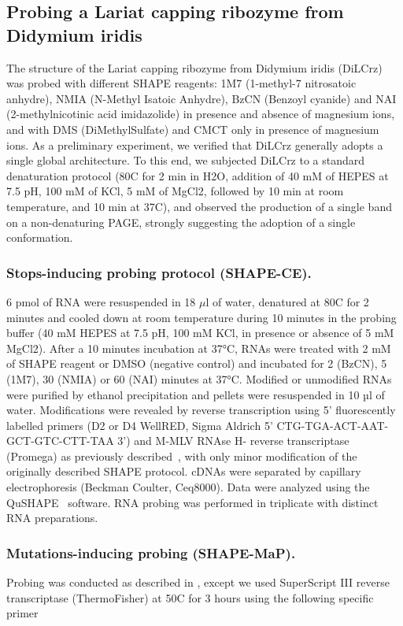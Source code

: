 \documentclass[a4,center,fleqn]{NAR}
\newcommand{\Draft}[1]{{#1}}
\newcommand{\ypi}[1]{\Draft{\todo[color=blue!30,inline]{\sf Yann: #1}}}
\begin{document}
\subsection{Probing a Lariat capping ribozyme from Didymium iridis}
The structure of the Lariat capping ribozyme from Didymium iridis (DiLCrz) was probed with different SHAPE reagents: 1M7 (1-methyl-7 nitrosatoic anhydre), NMIA (N-Methyl Isatoic Anhydre), BzCN (Benzoyl cyanide) and NAI (2-methylnicotinic acid imidazolide) in presence and absence of magnesium ions, and with DMS (DiMethylSulfate) and CMCT only in presence of magnesium ions.
As a preliminary experiment, we verified that DiLCrz generally adopts a single global architecture. To this end, we subjected DiLCrz to a standard denaturation protocol (80\degree{}C for 2 min in H2O, addition of 40 mM of HEPES at 7.5 pH, 100 mM of KCl, 5 mM of MgCl2, followed by 10 min at room temperature, and 10 min at 37\degree{}C), and observed the production of a single band on a non-denaturing PAGE, strongly suggesting the adoption of a single conformation.\ypi{Bruno $\to$ Est ce que c'est raisonnable ? OUI}

\subsubsection{Stops-inducing probing protocol (SHAPE-CE).} 
6 pmol of RNA were resuspended in 18 $\mu$l of water, denatured at 80\degree{}C for 2 minutes and cooled down at room temperature during 10 minutes in the probing buffer (40 mM HEPES at 7.5 pH, 100 mM KCl, in presence or absence of 5 mM MgCl2). After a 10 minutes incubation at 37°C, RNAs were treated with 2 mM of SHAPE reagent or DMSO (negative control) and incubated for 2 (BzCN), 5 (1M7), 30 (NMIA) or 60 (NAI) minutes at 37°C. Modified or unmodified RNAs were purified by ethanol precipitation and pellets were resuspended in 10 \(µ\)l of water.
Modifications were revealed by reverse transcription using 5’ fluorescently labelled primers (D2 or D4 WellRED, Sigma Aldrich 5’ CTG-TGA-ACT-AAT-GCT-GTC-CTT-TAA 3’) and M-MLV RNAse H- reverse transcriptase (Promega) as previously described~\cite{Deforges2017}, with only minor modification of the originally described SHAPE protocol\cite{Wilkinson2006}. cDNAs were separated by capillary electrophoresis (Beckman Coulter, Ceq8000). Data were analyzed using the  QuSHAPE~\cite{Karabiber2013} software. RNA probing was performed in triplicate with distinct RNA preparations.

\subsubsection{Mutations-inducing probing (SHAPE-MaP).}
Probing was conducted as described in \citet{Smola2015}, except we used SuperScript III reverse transcriptase (ThermoFisher) at 50\degree{}C for 3 hours using the following specific primer 
\end{document}
